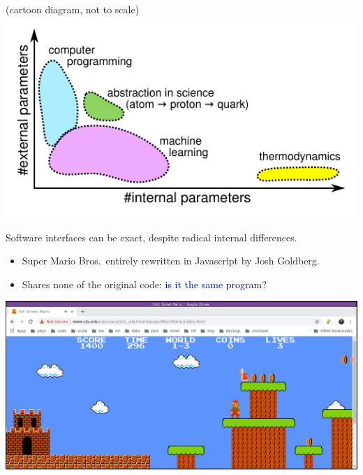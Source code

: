 \documentclass[aspectratio=169]{beamer}
\begin{document}
\begin{frame}{(cartoon diagram, not to scale)}
\vspace{0.2 cm}
\includegraphics[width=\linewidth]{internal-vs-external.pdf}
\end{frame}

\begin{frame}{Software interfaces can be exact, despite radical internal differences.}
\large
\vspace{0.13 cm}
\begin{itemize}
\item Super Mario Bros.\ entirely rewritten in Javascript by Josh Goldberg.
\item Shares none of the original code: \textcolor{darkblue}{is it the same program?}
\end{itemize}

\begin{center}
\includegraphics[width=0.97\linewidth]{supermario-javascript.png}
\end{center}
\end{frame}
\end{document}
